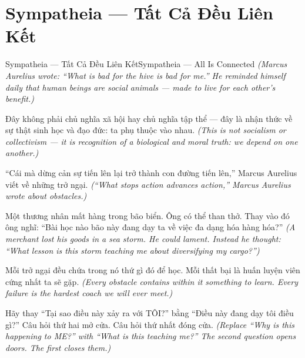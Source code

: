 \section{Sympatheia — Tất Cả Đều Liên Kết}
\begin{truyen}{Sympatheia — Tất Cả Đều Liên Kết}{Sympatheia — All Is Connected}
\textit{(Marcus Aurelius wrote: ``What is bad for the hive is bad for me.'' He reminded himself daily that human beings are social animals — made to live for each other's benefit.)}

Đây không phải chủ nghĩa xã hội hay chủ nghĩa tập thể — đây là nhận thức về sự thật sinh học và đạo đức: ta phụ thuộc vào nhau.
\textit{(This is not socialism or collectivism — it is recognition of a biological and moral truth: we depend on one another.)}

``Cái mà dừng cản sự tiến lên lại trở thành con đường tiến lên,'' Marcus Aurelius viết về những trở ngại.
\textit{(``What stops action advances action,'' Marcus Aurelius wrote about obstacles.)}

Một thương nhân mất hàng trong bão biển. Ông có thể than thở. Thay vào đó ông nghĩ: ``Bài học nào bão này đang dạy ta về việc đa dạng hóa hàng hóa?''
\textit{(A merchant lost his goods in a sea storm. He could lament. Instead he thought: ``What lesson is this storm teaching me about diversifying my cargo?'')}

Mỗi trở ngại đều chứa trong nó thứ gì đó để học. Mỗi thất bại là huấn luyện viên cứng nhất ta sẽ gặp.
\textit{(Every obstacle contains within it something to learn. Every failure is the hardest coach we will ever meet.)}

\end{truyen}

\begin{baihoc}
Hãy thay ``Tại sao điều này xảy ra với TÔI?'' bằng ``Điều này đang dạy tôi điều gì?'' Câu hỏi thứ hai mở cửa. Câu hỏi thứ nhất đóng cửa.
\textit{(Replace ``Why is this happening to ME?'' with ``What is this teaching me?'' The second question opens doors. The first closes them.)}
\end{baihoc}
\ngancach

